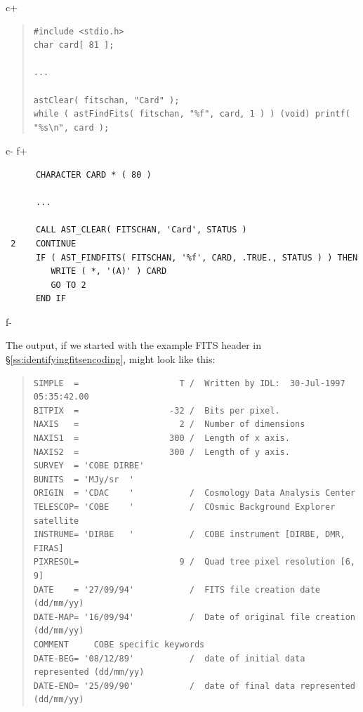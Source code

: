 \documentclass[twoside,11pt]{article}
\newcommand{\secref}[1]{\S\ref{#1}}
\newcommand{\secref}[1]{\ref{#1}}
\begin{document}
c+
\begin{quote}
\small
\begin{verbatim}
#include <stdio.h>
char card[ 81 ];

...

astClear( fitschan, "Card" );
while ( astFindFits( fitschan, "%f", card, 1 ) ) (void) printf( "%s\n", card );
\end{verbatim}
\normalsize
\end{quote}
c-
f+
\small
\begin{verbatim}
      CHARACTER CARD * ( 80 )

      ...

      CALL AST_CLEAR( FITSCHAN, 'Card', STATUS )
 2    CONTINUE
      IF ( AST_FINDFITS( FITSCHAN, '%f', CARD, .TRUE., STATUS ) ) THEN
         WRITE ( *, '(A)' ) CARD
         GO TO 2
      END IF
\end{verbatim}
\normalsize
f-

The output, if we started with the example FITS header in
\secref{ss:identifyingfitsencoding}, might look like this:

\begin{quote}
\small
\begin{verbatim}
SIMPLE  =                    T /  Written by IDL:  30-Jul-1997 05:35:42.00
BITPIX  =                  -32 /  Bits per pixel.
NAXIS   =                    2 /  Number of dimensions
NAXIS1  =                  300 /  Length of x axis.
NAXIS2  =                  300 /  Length of y axis.
SURVEY  = 'COBE DIRBE'
BUNITS  = 'MJy/sr  '
ORIGIN  = 'CDAC    '           /  Cosmology Data Analysis Center
TELESCOP= 'COBE    '           /  COsmic Background Explorer satellite
INSTRUME= 'DIRBE   '           /  COBE instrument [DIRBE, DMR, FIRAS]
PIXRESOL=                    9 /  Quad tree pixel resolution [6, 9]
DATE    = '27/09/94'           /  FITS file creation date (dd/mm/yy)
DATE-MAP= '16/09/94'           /  Date of original file creation (dd/mm/yy)
COMMENT     COBE specific keywords
DATE-BEG= '08/12/89'           /  date of initial data represented (dd/mm/yy)
DATE-END= '25/09/90'           /  date of final data represented   (dd/mm/yy)
\end{verbatim}
\normalsize
\end{quote}
\end{document}
